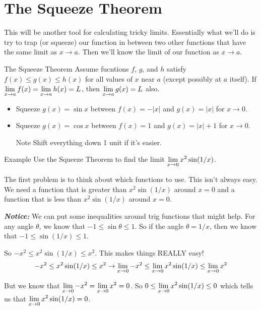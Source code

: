 \section*{The Squeeze Theorem}

This will be another tool for calculating tricky limits.
Essentially what we'll do is try to trap (or squeeze) our function in between two other functions that have the same limit as $x\to a$.
Then we'll know the limit of our function as $x \to a$.

\begin{thm}{The Squeeze Theorem}
  Assume fucntions $f$, $g$, and $h$ satisfy $f(x) \leq g(x) \leq h(x)$ for all values of $x$ near $a$ (except possibly at $a$ itself).
  If $\displaystyle \lim_{x\to a} f(x) = \displaystyle \lim_{x\to a} h(x) = L$, then $\displaystyle \lim_{x\to a} g(x) = L$ also.
\end{thm}

\begin{itemize}
  \item Squeeze $g(x) = \sin x$ between $f(x) =-|x|$ and $g(x) = |x|$ for $x\to 0$.
  \item Squeeze $g(x) = \cos x$ between $f(x) =1$ and $g(x) = |x|+1$ for $x\to 0$.
  \begin{note}{Note}
    Shift everything down 1 unit if it's easier.
  \end{note}
\end{itemize}

\begin{note}{Example}
  Use the Squeeze Theorem to find the limit $\displaystyle \lim_{x\to 0} x^2\sin(1/x)$.

  The first problem is to think about which functions to use.
  This isn't always easy.
  We need a function that is greater than $x^2\sin(1/x)$ around $x=0$ and a function that is less than $x^2\sin(1/x)$ around $x=0$.

  \textbf{\textit{Notice:}}
  We can put some inequalities around trig functions that might help.
  For any angle $\theta$, we know that $-1\leq \sin \theta \leq 1$.
  So if the angle $\theta = 1/x$, then we know that $-1\leq \sin(1/x) \leq 1$.

  So $-x^2 \leq x^2 \sin (1/x) \leq x^2$.
  This makes things REALLY easy!
  \[-x^2 \leq x^2 \sin (1/x) \leq x^2 \to \displaystyle \lim_{x\to0} -x^2 \leq \displaystyle \lim_{x\to0} x^2 \sin (1/x) \leq \displaystyle \lim_{x\to0} x^2\]

  But we know that $\displaystyle \lim_{x\to0} -x^2 = \displaystyle \lim_{x\to0} x^2 = 0$.
  So $0\leq \displaystyle \lim_{x\to0} x^2 \sin (1/x) \leq 0$ which tells us that $\displaystyle \lim_{x\to0} x^2 \sin (1/x)=0$.
\end{note}
